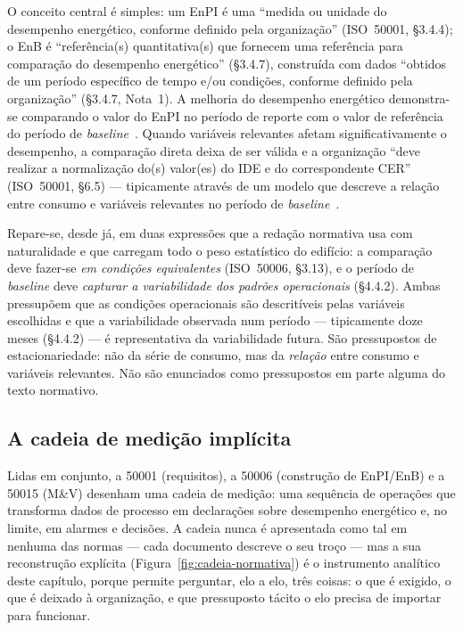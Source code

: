 O conceito central é simples: um EnPI é uma \enquote{medida ou unidade do desempenho energético, conforme definido pela organização} (ISO~50001, \S3.4.4); o EnB é \enquote{referência(s) quantitativa(s) que fornecem uma referência para comparação do desempenho energético} (\S3.4.7), construída com dados \enquote{obtidos de um período específico de tempo e/ou condições, conforme definido pela organização} (\S3.4.7, Nota~1). A melhoria do desempenho energético demonstra-se comparando o valor do EnPI no período de reporte com o valor de referência do período de \emph{baseline}~\cite[Figuras~1 e~3]{ISO50006_2014}. Quando variáveis relevantes afetam significativamente o desempenho, a comparação direta deixa de ser válida e a organização \enquote{deve realizar a normalização do(s) valor(es) do IDE e do correspondente CER} (ISO~50001, \S6.5) --- tipicamente através de um modelo que descreve a relação entre consumo e variáveis relevantes no período de \emph{baseline}~\cite[\S4.5.1 e Anexo~D]{ISO50006_2014}.

Repare-se, desde já, em duas expressões que a redação normativa usa com naturalidade e que carregam todo o peso estatístico do edifício: a comparação deve fazer-se \emph{em condições equivalentes} (ISO~50006, \S3.13), e o período de \emph{baseline} deve \emph{capturar a variabilidade dos padrões operacionais} (\S4.4.2). Ambas pressupõem que as condições operacionais são descritíveis pelas variáveis escolhidas e que a variabilidade observada num período --- tipicamente doze meses (\S4.4.2) --- é representativa da variabilidade futura. São pressupostos de estacionariedade: não da série de consumo, mas da \emph{relação} entre consumo e variáveis relevantes. Não são enunciados como pressupostos em parte alguma do texto normativo.

\subsection{A cadeia de medição implícita}
\label{sec:enb-cadeia}

Lidas em conjunto, a 50001 (requisitos), a 50006 (construção de EnPI/EnB) e a 50015 (M\&V) desenham uma cadeia de medição: uma sequência de operações que transforma dados de processo em declarações sobre desempenho energético e, no limite, em alarmes e decisões. A cadeia nunca é apresentada como tal em nenhuma das normas --- cada documento descreve o seu troço --- mas a sua reconstrução explícita (Figura~\ref{fig:cadeia-normativa}) é o instrumento analítico deste capítulo, porque permite perguntar, elo a elo, três coisas: o que é exigido, o que é deixado à organização, e que pressuposto tácito o elo precisa de importar para funcionar.

